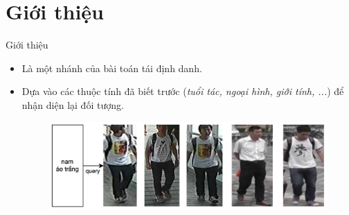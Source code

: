 \section{Giới thiệu}\label{sec:intro}
\frame{\tableofcontents[currentsection]}
\begin{frame}{Giới thiệu}

\begin{itemize}
    \item <1-> Là một nhánh của bài toán tái định danh.
    \item <2-> Dựa vào các thuộc tính đã biết trước (\textit{tuổi tác, ngoại hình, giới tính, ...}) để nhận diện lại đối tượng.
\begin{figure}[H]
    \centering
    \includegraphics[width=13cm]{images/example.png}
    \label{fig:example}
\end{figure}
\end{itemize}
\end{frame}
